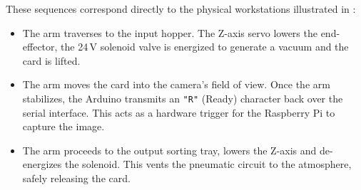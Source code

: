 These sequences correspond directly to the physical workstations illustrated in :
\begin{itemize}
    \item {} The arm traverses to the input hopper. The Z-axis servo lowers the end-effector, the 24\,V solenoid valve is energized to generate a vacuum and the card is lifted.
    \item {} The arm moves the card into the camera's field of view. Once the arm stabilizes, the Arduino transmits an \texttt{"R"} (Ready) character back over the serial interface. This acts as a hardware trigger for the Raspberry Pi to capture the image.
    \item {} The arm proceeds to the output sorting tray, lowers the Z-axis and de-energizes the solenoid. This vents the pneumatic circuit to the atmosphere, safely releasing the card.
\end{itemize}
